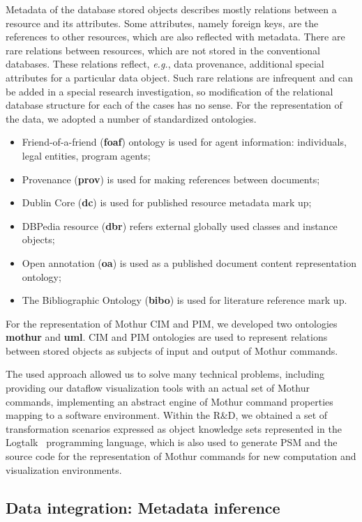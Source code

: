 \documentclass[a4paper]{jpconf}
\begin{document}
Metadata of the database stored objects describes mostly relations between a resource and its attributes.  Some attributes, namely foreign keys, are the references to other resources, which are also reflected with metadata.  There are rare relations between resources, which are not stored in the conventional databases.  These relations reflect, \emph{e.g.}, data provenance, additional special attributes for a particular data object.  Such rare relations are infrequent and can be added in a special research investigation, so modification of the relational database structure for each of the cases has no sense. For the representation of the data, we adopted a number of standardized ontologies.
\begin{itemize}
\item Friend-of-a-friend (\textbf{foaf}) ontology is used for agent
  information: individuals, legal entities, program agents;
\item Provenance (\textbf{prov}) is used for making references between documents;
\item Dublin Core (\textbf{dc}) is used for published resource metadata mark up;
\item DBPedia resource (\textbf{dbr}) refers external globally used classes and instance objects;
\item Open annotation (\textbf{oa}) is used as a published document content representation ontology;
\item The Bibliographic Ontology (\textbf{bibo}) is used for literature reference mark up.
\end{itemize}
For the representation of Mothur CIM and PIM, we developed two ontologies \textbf{mothur} and \textbf{uml}.  CIM and PIM ontologies are used to represent relations between stored objects as subjects of input and output of Mothur commands.

The used approach allowed us to solve many technical problems, including providing our dataflow visualization tools with an actual set of Mothur commands, implementing an abstract engine of Mothur command properties mapping to a software environment.  Within the R\&D, we obtained a set of transformation scenarios expressed as object knowledge sets represented in the Logtalk~\cite{logtalk} programming language, which is also used to generate PSM and the source code for the representation of Mothur commands for new computation and visualization environments.

\subsection{Data integration: Metadata inference}
\end{document}
